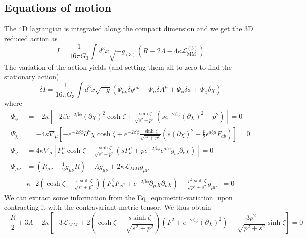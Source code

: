 \subsection{Equations of motion}
The 4D lagrangian is integrated along the compact dimension and we get the 3D reduced action as  
\begin{equation}
    I = \frac{1}{16\pi G_3}\int d^3x\sqrt{-g_{(3)}} \left(R - 2\Lambda - 4\kappa\mathcal{L}_{\text{MM}}^{(3)}\right)
\end{equation}
The variation of the action yields (and setting them all to zero to find the stationary action) 
\begin{equation}
    \delta I = \frac{1}{16\pi G_3}\int d^3x \sqrt{-g} \left ( \Psi_{\mu\nu}\delta g^{\mu\nu} + \Psi_\mu \delta A^\mu + \Psi_\phi \delta \phi + \Psi_\chi \delta \chi \right) 
\end{equation}
where 
\begin{align}
    \Psi_\phi &= -2\kappa \left [ -2\beta e^{-2\beta\phi} (\partial \chi)^2\cosh\zeta + \frac{\sinh\zeta}{\sqrt{s^2+p^2} } \left ( s e^{-2\beta\phi} (\partial \chi)^2 + p^2\right) \right ] = 0\\ 
    \Psi_\chi &= -4\kappa \nabla_\mu \left [-e^{-2\beta\phi} \partial^\mu \chi \cosh\zeta + e^{-2\beta\phi}\frac{\sinh\zeta}{\sqrt{s^2+p^2} } \left ( s (\partial \chi)^2 + \frac{p}{2}\epsilon^{ab\mu}F_{ab}\right)  \right ] = 0 \\ 
    \Psi_\nu &= 4\kappa \nabla_\mu \left [ F^\mu_\nu\cosh\zeta -  \frac{\sinh\zeta}{\sqrt{s^2+p^2} } \left ( s F^\mu_\nu + p e^{-2\beta\phi}\epsilon^{\mu bc}g_{b\nu}\partial_c\chi\right) \right ] = 0 \\ 
    \label{eqn:metric-variation}
    \Psi_{\mu\nu} &= \left ( R_{\mu\nu} - \frac{1}{2}g_{\mu\nu}R \right ) + \Lambda g_{\mu\nu} + 2\kappa \mathcal{L}_{MM}g_{\mu\nu} - \\ & \kappa \left [ 2 \left ( \cosh \zeta - \frac{s \sinh \zeta}{\sqrt{s^2+p^2} } \right ) \left ( F^\beta_\mu F_{\nu\beta} + e^{-2\beta\phi}\partial_\mu\chi\partial_\nu\chi \right ) - \frac{p^2\sinh\zeta}{\sqrt{p^2+s^2} }g_{\mu\nu}\right ] = 0
\end{align}
We can extract some information from the Eq~\ref{eqn:metric-variation} upon contracting it with the contravariant metric tensor. We thus obtain 
\begin{equation}
    -\frac{R}{2} + 3\Lambda -2\kappa \left [-3\mathcal{L}_{MM} + 2 \left ( \cosh \zeta - \frac{s \sinh \zeta}{\sqrt{s^2+p^2} } \right ) \left ( F^2 + e^{-2\beta\phi} (\partial \chi)^2\right ) - \frac{3p^2}{\sqrt{p^2+s^2} }\sinh\zeta \right ] = 0
\end{equation}


